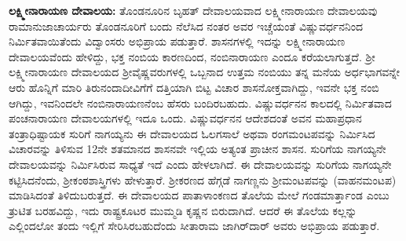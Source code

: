 \textbf{ಲಕ್ಷ್ಮೀನಾರಾಯಣ ದೇವಾಲಯ:} ತೊಂಡನೂರಿನ ಬೃಹತ್​ ದೇವಾಲಯವಾದ ಲಕ್ಷ್ಮೀನಾರಾಯಣ ದೇವಾಲಯವು ರಾಮಾನುಜಾಚಾರ್ಯರು ತೊಂಡನೂರಿಗೆ ಬಂದು ನೆಲೆಸಿದ ನಂತರ ಅವರ ಇಚ್ಚೆಯಂತೆ ವಿಷ್ಣುವರ್ಧನನಿಂದ ನಿರ್ಮಿತವಾಯಿ\-ತೆಂದು ವಿದ್ವಾಂಸರು ಅಭಿಪ್ರಾಯ ಪಡುತ್ತಾರೆ. ಶಾಸನಗಳಲ್ಲಿ ಇದನ್ನು ಲಕ್ಷ್ಮೀನಾರಾಯಣ ದೇವಾಲಯವೆಂದು ಹೇಳಿದ್ದು, ಭಕ್ತ ನಂಬಿಯ ಕಾರಣದಿಂದ, ನಂಬಿನಾರಾಯಣ ಎಂದೂ ಕರೆಯಲಾಗುತ್ತದೆ. ಶ‍್ರೀ ಲಕ್ಷ್ಮೀನಾರಾಯಣ ದೇವಾಲಯದ ಶ‍್ರೀವೈಷ್ಣವರುಗಳಲ್ಲಿ ಒಬ್ಬನಾದ ಉತ್ತಮ ನಂಬಿಯು ತನ್ನ ಮನೆಯ ಅರ್ಧಭಾಗವನ್ನೇ ಆರು ಹೊನ್ನಿಗೆ ಮಾರಿ ತಿರುನಂದಾ\-ದೀವಿಗೆಗೆ ದತ್ತಿಯಾಗಿ ಬಿಟ್ಟ ವಿಚಾರ ಶಾಸನೋಕ್ತವಾಗಿದ್ದು, ಇವನೇ ಭಕ್ತ ನಂಬಿ ಆಗಿದ್ದು, ಇವನಿಂದಲೇ ನಂಬಿನಾರಾಯಣನೆಂಬ ಹೆಸರು ಬಂದಿರಬಹುದು. ವಿಷ್ಣುವರ್ಧನನ ಕಾಲದಲ್ಲಿ ನಿರ್ಮಿತವಾದ ಪಂಚನಾರಾಯಣ ದೇವಾಲಯಗಳಲ್ಲಿ ಇದೂ ಒಂದು. ವಿಷ್ಣುವರ್ಧನನ ಆದೇಶದಂತೆ ಅವನ ಮಹಾಪ್ರಧಾನ ತಂತ್ರಾಧಿಷ್ಟಾಯಕ ಸುರಿಗೆ ನಾಗಯ್ಯನು ಈ ದೇವಾಲಯದ ಓಲಗಸಾಲೆ ಅಥವಾ ರಂಗಮಂಟಪವನ್ನು ನಿರ್ಮಿಸಿದ ವಿಚಾರವನ್ನು ತಿಳಿಸುವ 12ನೇ ಶತಮಾನದ ಶಾಸನವೇ ಇಲ್ಲಿಯ ಅತ್ಯಂತ ಪ್ರಾಚೀನ ಶಾಸನ. ಸುರಿಗೆಯ ನಾಗಯ್ಯನೇ ದೇವಾಲಯವನ್ನು ನಿರ್ಮಿಸಿರುವ ಸಾಧ್ಯತೆ ಇದೆ ಎಂದು ಹೇಳಲಾಗಿದೆ. ಈ ದೇವಾಲಯವನ್ನು ಸುರಿಗೆಯ ನಾಗಯ್ಯನೇ ಕಟ್ಟಿಸಿದನೆಂದು, ಶ‍್ರೀಕಂಠಶಾಸ್ತ್ರಿಗಳು ಹೇಳುತ್ತಾರೆ. ಶ‍್ರೀಕರಣದ ಹೆಗ್ಗಡೆ ನಾಗಣ್ಣನು ಶ‍್ರೀಮಂಟಪವನ್ನು (ವಾಹನಮಂಟಪ) ಮಾಡಿಸಿದಂತೆ ತಿಳಿದುಬರುತ್ತದೆ. ಈ ದೇವಾಲಯದ ಪಾತಾಳಾಂಕಣದ ತೊಲೆಯ ಮೇಲೆ ಗಂಡಮಾರ್ತ್ತಾಂಡ ಎಂಬು ತ್ರುಟಿತ ಬರಹವಿದ್ದು, ಇದು ರಾಷ್ಟ್ರಕೂಟರ ಮುಮ್ಮಡಿ ಕೃಷ್ಣನ ಬಿರುದಾಗಿದೆ. ಆದರೆ ಈ ತೊಲೆಯ ಕಲ್ಲನ್ನು ಎಲ್ಲಿಂದಲೋ ತಂದು ಇಲ್ಲಿಗೆ ಸೇರಿಸಿರಬಹುದೆಂದು ಸೀತಾರಾಮ ಜಾಗಿರ್​ದಾರ್​ ಅವರು ಅಭಿಪ್ರಾಯ ಪಡುತ್ತಾರೆ.

